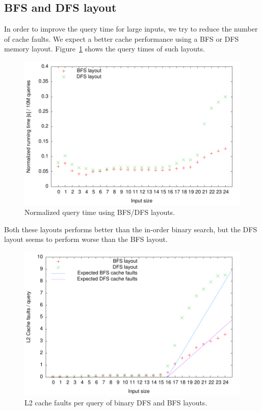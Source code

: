 \subsection{BFS and DFS layout}
In order to improve the query time for large inputs, we try to
reduce the number of cache faults. We expect a better cache
performance using a BFS or DFS memory
layout. Figure~\ref{fig:bfs_dfs_runningtime} shows the query times of
such layouts.
\begin{figure}[h!]
  \centering
  \includegraphics[width=\textwidth]{../week1/plots/outputs/bfs_dfs_runningtime}
  \caption{Normalized query time using BFS/DFS layouts.}
  \label{fig:bfs_dfs_runningtime}
\end{figure}
Both these layouts performs better than the in-order binary search,
but the DFS layout seems to perform worse than the BFS layout.


\begin{figure}[h!]
  \label{fig:bfs_dfs_cachefaults}
  \centering
  \includegraphics[width=\textwidth]{../week1/plots/outputs/bfs_dfs_cachefaults}
  \caption{L2 cache faults per query of binary DFS and BFS layouts.}
\end{figure}

